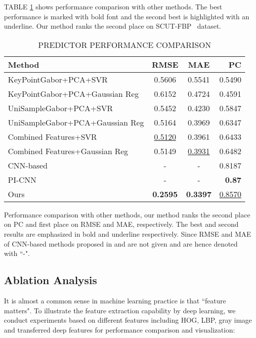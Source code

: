 \documentclass[a4paper,conference]{IEEEtran}
\begin{document}
    TABLE \ref{performance comparison} shows performance comparison with other
    methods. The best performance is marked with bold font and the second best
    is highlighted with an underline.
    Our method ranks the second place on SCUT-FBP~\cite{xie2015scut} dataset.
   \begin{table}[!hbt]
      \caption{PREDICTOR PERFORMANCE COMPARISON}
      \label{performance comparison}
      \begin{center}
        \begin{tabular}{l|ccr}
          \hline
          \textbf{Method} & \textbf{RMSE} & \textbf{MAE} & \textbf{PC} \\ \hline\hline
          KeyPointGabor+PCA+SVR & 0.5606 & 0.5541 & 0.5490 \\
          KeyPointGabor+PCA+Gaussian Reg & 0.6152 & 0.4724 & 0.4591 \\
          UniSampleGabor+PCA+SVR & 0.5452 & 0.4230 & 0.5847 \\
          UniSampleGabor+PCA+Gaussian Reg & 0.5164 & 0.3969 & 0.6347 \\
          Combined Features+SVR~\cite{xie2015scut} & \underline{0.5120} & 0.3961 & 0.6433 \\
          Combined Features+Gaussian Reg~\cite{xie2015scut} & 0.5149 & \underline{0.3931} & 0.6482 \\
          CNN-based \cite{xie2015scut} & - & - & 0.8187 \\
          PI-CNN \cite{Xu2017Facial} & - & - & {\textbf{0.87}} \\
          Ours & {\textbf{0.2595}} & {\textbf{0.3397}} & {\underline{0.8570}} \\ \hline
        \end{tabular}
        \begin{tablenotes}
          \footnotesize
          Performance comparison with other methods, our method ranks the second
          place on PC and first place on RMSE and MAE, respectively.
          The best and second results are emphasized in bold and underline respectively.
          Since RMSE and MAE of CNN-based methods proposed in
          \cite{xie2015scut} and \cite{Xu2017Facial} are not given and are hence
          denoted with ``-".
        \end{tablenotes}
      \end{center}
    \end{table}

  \subsection{Ablation Analysis}
    It is almost a common sense in machine learning practice is that ``feature
    matters".
    To illustrate the feature extraction capability by deep learning,
    we conduct experiments based on different features including HOG, LBP,
    gray image and transferred deep features for performance comparison
    and visualization:
\end{document}

